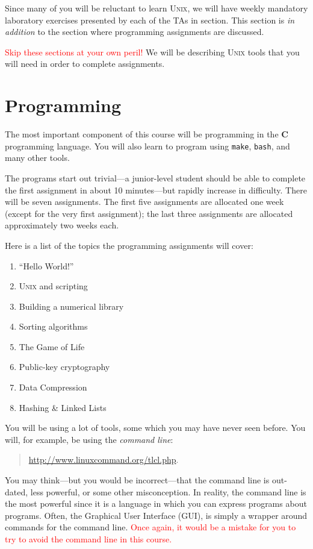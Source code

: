 \documentclass[11pt]{article}
\begin{document}
Since many of you will be reluctant to learn \textsc{Unix}, we will have
weekly mandatory laboratory exercises presented by each of the TAs in
section. This section is \emph{in addition} to the section where
programming assignments are discussed.

\textcolor{red}{Skip these sections at your own peril!} We will be
describing \textsc{Unix} tools that you will need in order to complete
assignments.

\section{Programming}

The most important component of this course will be programming in the
\textbf{C} programming language. You will also learn to program using
\texttt{make}, \texttt{bash}, and many other tools.

The programs start out trivial---a junior-level student should be able
to complete the first assignment in about 10 minutes---but rapidly
increase in difficulty. There will be seven assignments. The first five
assignments are allocated one week (except for the very first
assignment); the last three assignments are allocated approximately two
weeks each.

Here is a list of the topics the programming assignments will cover:

\begin{adjmulticols}{2}{\oddsidemargin}{\oddsidemargin}
\begin{enumerate}[start=0]
  \item ``Hello World!''
  \item \textsc{Unix} and scripting
  \item Building a numerical library
  \item Sorting algorithms
  \item The Game of Life
  \item Public-key cryptography
  \item Data Compression
  \item Hashing \& Linked Lists
\end{enumerate}
\end{adjmulticols}

You will be using a lot of tools, some which you may have never seen before. You
will, for example, be using the \emph{command line}:
\begin{quotation}
\centerline{\url{http://www.linuxcommand.org/tlcl.php}.}
\end{quotation}
You may think---but you would be incorrect---that the command line is out-dated,
less powerful, or some other misconception. In reality, the command line is the
most powerful since it is a language in which you can express programs about
programs. Often, the Graphical User Interface (GUI), is simply a wrapper around
commands for the command line. \textcolor{red}{Once again, it would be a
mistake for you to try to avoid the command line in this course.}
\end{document}
